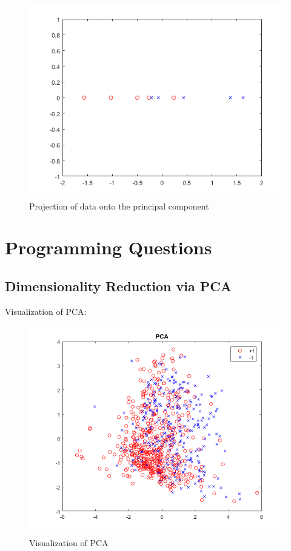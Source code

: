 \documentclass[12pt]{article}
\begin{document}
\begin{figure}[h!]
    \begin{center}
        \includegraphics[scale=1.2]{TQ2_e.png}
        \caption{Projection of data onto the principal component}
    \end{center}
\end{figure}

\newpage

\section{Programming Questions}
\subsection{Dimensionality Reduction via PCA}

Visualization of PCA:

\begin{figure}[h!]
    \begin{center}
        \includegraphics[scale=1.1]{PCA.png}
        \caption{Visualization of PCA}
    \end{center}
\end{figure}
\end{document}
